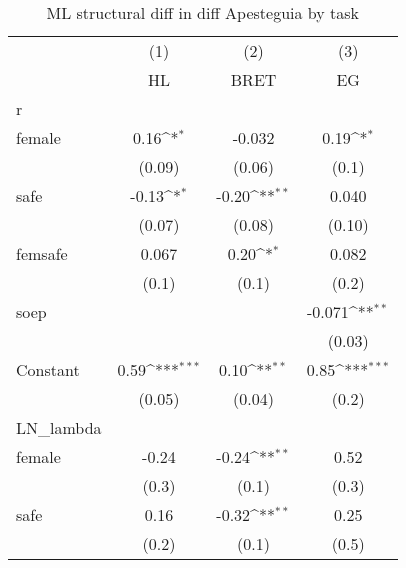 \begin{table}[htbp]\centering
\def\sym#1{\ifmmode^{#1}\else\(^{#1}\)\fi}
\caption{ML structural diff in diff Apesteguia by task \label{tab:Success}}
\begin{tabular}{l*{3}{c}}
\toprule
                    &\multicolumn{1}{c}{(1)}&\multicolumn{1}{c}{(2)}&\multicolumn{1}{c}{(3)}\\
                    &\multicolumn{1}{c}{HL}&\multicolumn{1}{c}{BRET}&\multicolumn{1}{c}{EG}\\
\midrule
r                   &                     &                     &                     \\
female              &        0.16\sym{*}  &      -0.032         &        0.19\sym{*}  \\
                    &      (0.09)         &      (0.06)         &       (0.1)         \\
\addlinespace
safe                &       -0.13\sym{*}  &       -0.20\sym{**} &       0.040         \\
                    &      (0.07)         &      (0.08)         &      (0.10)         \\
\addlinespace
femsafe             &       0.067         &        0.20\sym{*}  &       0.082         \\
                    &       (0.1)         &       (0.1)         &       (0.2)         \\
\addlinespace
soep                &                     &                     &      -0.071\sym{**} \\
                    &                     &                     &      (0.03)         \\
\addlinespace
Constant            &        0.59\sym{***}&        0.10\sym{**} &        0.85\sym{***}\\
                    &      (0.05)         &      (0.04)         &       (0.2)         \\
\midrule
LN\_lambda           &                     &                     &                     \\
female              &       -0.24         &       -0.24\sym{**} &        0.52         \\
                    &       (0.3)         &       (0.1)         &       (0.3)         \\
\addlinespace
safe                &        0.16         &       -0.32\sym{**} &        0.25         \\
                    &       (0.2)         &       (0.1)         &       (0.5)         \\

\end{tabular}
\end{table}
